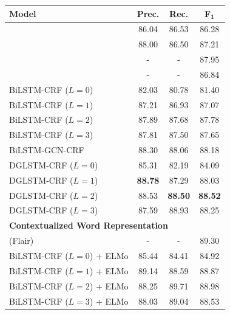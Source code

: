 \begin{table}[h!]
	\centering
		\begin{tabular}{lccc}
			\toprule
			\textbf{Model}& \textbf{Prec.} & \textbf{Rec.} & \textbf{F}$_\mathbf{1}$ \\
			\midrule
			
			\citet{chiu2016named}  &86.04 & 86.53 & 86.28\\
			\citet{li2017leveraging}   & 88.00 & 86.50 & 87.21 \\
			\citet{ghaddar2018robust} &- &- & 87.95 \\
			\citet{strubell2017fast} &-& -&   86.84 \\
			\cdashlinelr{1-4}
			BiLSTM-CRF ($L=0$) &82.03 & 80.78&81.40  \\
			BiLSTM-CRF ($L=1$) & 87.21 & 86.93 & 87.07 \\
			BiLSTM-CRF ($L=2$)  & 87.89 & 87.68 & 87.78 \\
			BiLSTM-CRF ($L=3$)  &  87.81& 87.50 & 87.65 \\
			BiLSTM-GCN-CRF  &88.30 & 88.06 & 88.18 \\
			\cdashlinelr{1-4}
			DGLSTM-CRF ($L=0$) &85.31  & 82.19 & 84.09 \\
			DGLSTM-CRF ($L=1$) & \textbf{88.78} & 87.29 & 88.03 \\
			DGLSTM-CRF ($L=2$)& 88.53 & \textbf{88.50} & {\bf 88.52} \\
			DGLSTM-CRF ($L=3$)& 87.59 & 88.93 & 88.25 \\[1mm]
			
			\multicolumn{3}{l}{\textbf{Contextualized Word Representation}} &\\
			\citet{akbik2018coling} (Flair) & - & - & 89.30 \\
			\cdashlinelr{1-4}
			BiLSTM-CRF ($L=0$) + {\footnotesize ELMo} & 85.44& 84.41 & 84.92 \\
			BiLSTM-CRF ($L=1$) + {\footnotesize ELMo} & 89.14 & 88.59 & 88.87 \\
			BiLSTM-CRF  ($L=2$) + {\footnotesize ELMo}  & 88.25 & 89.71 & 88.98 \\
			BiLSTM-CRF ($L=3$) + {\footnotesize ELMo} & 88.03 & 89.04 & 88.53 \\
			

\end{tabular}
\end{table}
